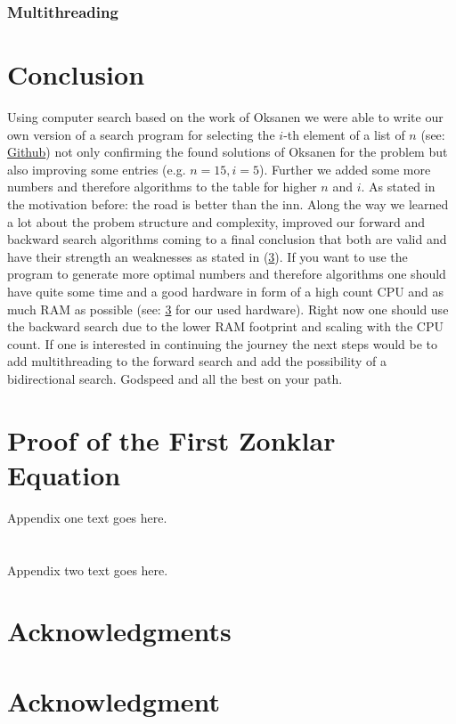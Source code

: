 \documentclass[10pt,journal,compsoc]{IEEEtran}
\begin{document}
\subsubsection{Multithreading}

\section{Conclusion}
Using computer search based on the work of Oksanen we were able to write our own
version of a search program for selecting the $i$-th element of a list of $n$
(see: \href{https://github.com/JGDoerrer/selection_generator}{Github}) not only
confirming the found solutions of Oksanen for the problem but also improving
some entries (e.g. $n=15, i=5$). Further we added some more numbers and
therefore algorithms to the table for higher $n$ and $i$. As stated in the
motivation before: the road is better than the inn. Along the way we learned a
lot about the probem structure and complexity, improved our forward and backward
search algorithms coming to a final conclusion that both are valid and have
their strength an weaknesses as stated in (\ref{}). If you want to use the
program to generate more optimal numbers and therefore algorithms one should
have quite some time and a good hardware in form of a high count CPU and as much
RAM as possible (see: \ref{} for our used hardware). Right now one should use
the backward search due to the lower RAM footprint and scaling with the CPU
count. If one is interested in continuing the journey the next steps would be to
add multithreading to the forward search and add the possibility of a
bidirectional search. Godspeed and all the best on your path.



\appendices
\section{Proof of the First Zonklar Equation}
Appendix one text goes here.
\section{}
Appendix two text goes here.


\ifCLASSOPTIONcompsoc
  \section*{Acknowledgments}
\else
  \section*{Acknowledgment}
\fi
\end{document}
